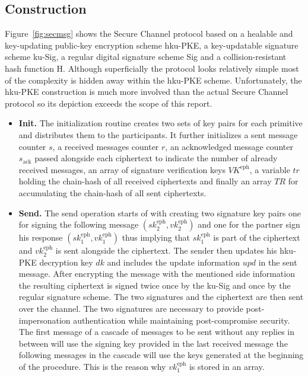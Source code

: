 \documentclass[11pt,a4paper,twoside,openright,bibliography=totoc]{scrbook}
\renewcommand{\t}{\text} %
\begin{document}
\subsection{Construction}
\label{sec:construction-3}

Figure~\ref{fig:secmsg} shows the Secure Channel protocol based on a healable and key-updating
public-key encryption scheme hku-PKE, a key-updatable signature scheme ku-Sig,
a regular digital signature scheme Sig and a collision-resistant hash function H.
Although superficially the protocol looks relatively simple most of the
complexity is hidden away within the hku-PKE scheme. Unfortunately, the hku-PKE
construction is much more involved than the actual Secure Channel protocol so
its depiction exceeds the scope of this report.
\begin{itemize}
\item \textbf{Init.} The initialization routine creates two sets of key pairs
  for each primitive and distributes them to the participants. It further
  initializes a sent message counter $s$, a received messages counter $r$,
  an acknowledged message counter $s_\t{ack}$ passed alongside
  each ciphertext to indicate the number of already received messages, an array
  of signature verification keys $VK^\t{eph}$, a variable $tr$ holding the chain-hash
  of all received ciphertexts and finally an array $TR$ for accumulating
  the chain-hash of all sent ciphertexts.
\item \textbf{Send.} The send operation starts of with creating two signature
  key pairs one for signing the following message $(sk_2^\t{eph},vk_2^\t{eph})$
  and one for the partner sign his response $(sk_1^\t{eph},vk_1^\t{eph})$ thus
  implying that $sk_1^\t{eph}$ is part of the ciphertext and $vk_2^\t{eph}$ is
  sent alongside the ciphertext. The sender then updates his
  hku-PKE decryption key $dk$ and includes the update information $upd$
  in the sent message. After encrypting the message with the mentioned
  side information the resulting ciphertext is signed twice once
  by the ku-Sig and once by the regular signature scheme. The two signatures
  and the ciphertext are then sent over the channel. The two signatures are
  necessary to provide post-impersonation authentication while
  maintaining post-compromise
  security. The first message of a cascade of messages to be sent
  without any replies in between will use the signing key provided in
  the last received message the following messages in the cascade
  will use the keys generated at the beginning of the procedure. This
  is the reason why $vk_1^\t{eph}$ is stored in an array.

\end{itemize}
\end{document}

